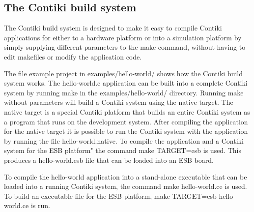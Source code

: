 \hypertarget{a00044}{\subsection{\-The \-Contiki build system}
\label{a00044}
}


 


\-The \-Contiki build system is designed to make it easy to compile \-Contiki applications for either to a hardware platform or into a simulation platform by simply supplying different parameters to the {\ttfamily make} command, without having to edit makefiles or modify the application code.

\-The file example project in examples/hello-\/world/ shows how the \-Contiki build system works. \-The {\ttfamily hello-\/world.\-c} application can be built into a complete \-Contiki system by running {\ttfamily make} in the examples/hello-\/world/ directory. \-Running {\ttfamily make} without parameters will build a \-Contiki system using the {\ttfamily native} target. \-The {\ttfamily native} target is a special \-Contiki platform that builds an entire \-Contiki system as a program that runs on the development system. \-After compiling the application for the {\ttfamily native} target it is possible to run the \-Contiki system with the application by running the file {\ttfamily hello-\/world.\-native}. \-To compile the application and a \-Contiki system for the \-E\-S\-B platform" the command {\ttfamily make \-T\-A\-R\-G\-E\-T=esb} is used. \-This produces a hello-\/world.\-esb file that can be loaded into an \-E\-S\-B board.

\-To compile the hello-\/world application into a stand-\/alone executable that can be loaded into a running \-Contiki system, the command {\ttfamily make hello-\/world.\-ce} is used. \-To build an executable file for the \-E\-S\-B platform, {\ttfamily make \-T\-A\-R\-G\-E\-T=esb hello-\/world.\-ce} is run.

